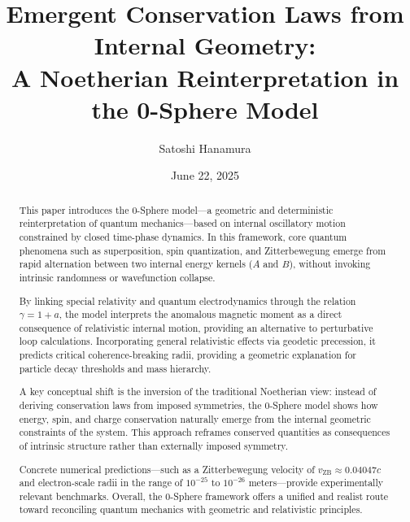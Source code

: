 \documentclass[%
 reprint,
 amsmath,amssymb,
 aps,
]{revtex4-1}
\numberwithin{equation}{section}%
\begin{document}


\title{Emergent Conservation Laws from Internal Geometry:\\ A Noetherian Reinterpretation in the 0-Sphere Model}
\author{Satoshi Hanamura}
\date{June 22, 2025}


\begin{abstract}
This paper introduces the 0-Sphere model—a geometric and deterministic reinterpretation of quantum mechanics—based on internal oscillatory motion constrained by closed time-phase dynamics. In this framework, core quantum phenomena such as superposition, spin quantization, and Zitterbewegung emerge from rapid alternation between two internal energy kernels ($A$ and $B$), without invoking intrinsic randomness or wavefunction collapse.

By linking special relativity and quantum electrodynamics through the relation $\gamma = 1 + a$, the model interprets the anomalous magnetic moment as a direct consequence of relativistic internal motion, providing an alternative to perturbative loop calculations. Incorporating general relativistic effects via geodetic precession, it predicts critical coherence-breaking radii, providing a geometric explanation for particle decay thresholds and mass hierarchy.

A key conceptual shift is the inversion of the traditional Noetherian view: instead of deriving conservation laws from imposed symmetries, the 0-Sphere model shows how energy, spin, and charge conservation naturally emerge from the internal geometric constraints of the system. This approach reframes conserved quantities as consequences of intrinsic structure rather than externally imposed symmetry.

Concrete numerical predictions—such as a Zitterbewegung velocity of $v_{\mathrm{ZB}} \approx 0.04047c$ and electron-scale radii in the range of $10^{-25}$ to $10^{-26}$ meters—provide experimentally relevant benchmarks. Overall, the 0-Sphere framework offers a unified and realist route toward reconciling quantum mechanics with geometric and relativistic principles.
\end{abstract}
\end{document}
